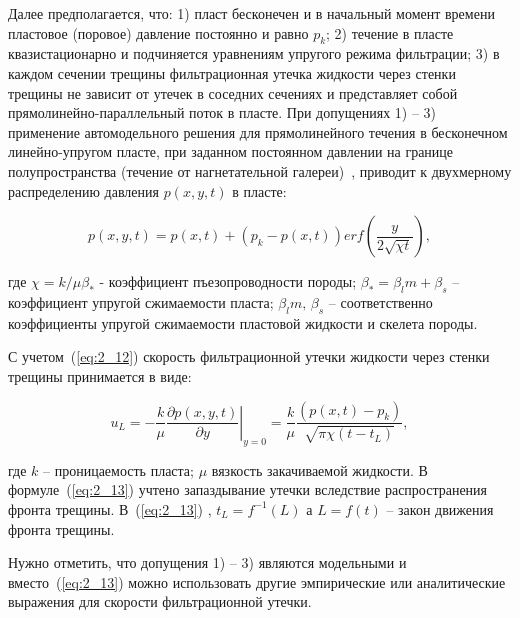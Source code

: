 Далее предполагается, что: 1) пласт бесконечен и в начальный момент времени пластовое (поровое) давление постоянно и равно $p_k$; 2) течение в пласте квазистационарно и подчиняется уравнениям упругого режима фильтрации; 3) в каждом сечении трещины фильтрационная утечка жидкости через стенки трещины не зависит от утечек в соседних сечениях и представляет собой прямолинейно-параллельный поток в пласте. При допущениях 1) – 3) применение автомодельного решения для прямолинейного течения в бесконечном линейно-упругом пласте, при заданном постоянном давлении на границе полупространства (течение от нагнетательной галереи)~\cite{Smirn_Tag1}, приводит к двухмерному распределению давления $p\left(x,y,t\right)$ в пласте:

\begin{equation}

p\left(x,y,t\right) = p \left(x,t\right) + \left(p_k - p \left(x,t\right)\right) erf \left(\frac{y}{2 \sqrt{\chi t}}\right) , \label{eq:2_12}

\end{equation}

где $\chi = k/\mu \beta_*$ - коэффициент пъезопроводности породы; $\beta_* = \beta_l m + \beta_s$ – коэффициент упругой сжимаемости пласта; $\beta_l m,\, \beta_s$ – соответственно коэффициенты упругой сжимаемости пластовой жидкости и скелета породы.



С учетом~(\ref{eq:2_12}) скорость фильтрационной утечки жидкости через стенки трещины принимается в виде:

\begin{equation}

u_L = \left.-\frac{k}{\mu} \frac{\partial p\left(x,y,t\right)}{\partial y}\right|_{y=0} = \frac{k}{\mu} \frac{\left(p \left(x,t\right) - p_k\right)}{\sqrt{\pi \chi \left(t-t_L\right)}}, \label{eq:2_13}

\end{equation}

где $k$ – проницаемость пласта; $\mu$  вязкость закачиваемой жидкости. В формуле~(\ref{eq:2_13}) учтено запаздывание утечки вследствие распространения фронта трещины. В~(\ref{eq:2_13}) , $t_L = f^{-1} (L)$ а $L= f(t)$  – закон движения фронта трещины.



Нужно отметить, что допущения 1) – 3) являются модельными и вместо~(\ref{eq:2_13}) можно использовать другие эмпирические или аналитические выражения для скорости фильтрационной утечки.


